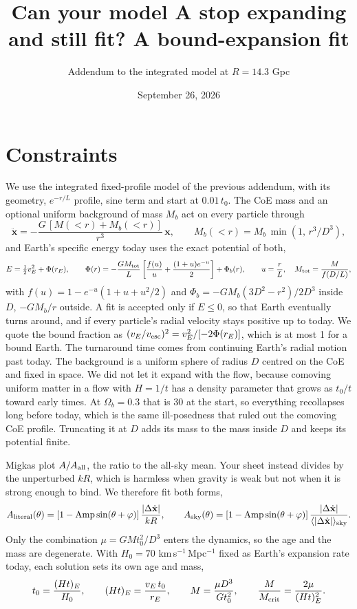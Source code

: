 \documentclass[10pt,letterpaper]{article}
\title{\vspace{-1.2cm}Can your model A stop expanding and still fit? A bound-expansion fit}
\author{Addendum to the integrated model at $R=14.3$ Gpc}
\date{September 26, 2026}
\begin{document}
\maketitle\vspace{-0.9cm}

\section{Constraints}
We use the integrated fixed-profile model of the previous addendum, with its geometry, $e^{-r/L}$ profile, sine term and start at $0.01\,t_0$. The CoE mass and an optional uniform background of mass $M_b$ act on every particle through
\begin{equation}\label{eq:eom}
\ddot{\mathbf x}=-\frac{G\,[M(<r)+M_b(<r)]}{r^3}\,\mathbf x,\qquad M_b(<r)=M_b\,\min\!\left(1,\,r^3/D^3\right),
\end{equation}
and Earth's specific energy today uses the exact potential of both,
\begin{equation}\label{eq:E}
E=\tfrac12 v_E^2+\Phi(r_E),\qquad
\Phi(r)=-\frac{G M_{\rm tot}}{L}\left[\frac{f(u)}{u}+\frac{(1+u)e^{-u}}{2}\right]+\Phi_b(r),\qquad u=\frac rL,\quad M_{\rm tot}=\frac{M}{f(D/L)},
\end{equation}
with $f(u)=1-e^{-u}(1+u+u^2/2)$ and $\Phi_b=-GM_b(3D^2-r^2)/2D^3$ inside $D$, $-GM_b/r$ outside. A fit is accepted only if $E\le0$, so that Earth eventually turns around, and if every particle's radial velocity stays positive up to today. We quote the bound fraction as $(v_E/v_{\rm esc})^2=v_E^2/[-2\Phi(r_E)]$, which is at most 1 for a bound Earth. The turnaround time comes from continuing Earth's radial motion past today. The background is a uniform sphere of radius $D$ centred on the CoE and fixed in space. We did not let it expand with the flow, because comoving uniform matter in a flow with $H=1/t$ has a density parameter that grows as $t_0/t$ toward early times. At $\Omega_b=0.3$ that is 30 at the start, so everything recollapses long before today, which is the same ill-posedness that ruled out the comoving CoE profile. Truncating it at $D$ adds its mass to the mass inside $D$ and keeps its potential finite.

Migkas plot $A/A_{\rm all}$, the ratio to the all-sky mean. Your sheet instead divides by the unperturbed $kR$, which is harmless when gravity is weak but not when it is strong enough to bind. We therefore fit both forms,
\begin{equation}\label{eq:norm}
A_{\rm literal}(\theta)=\left[1-{\rm Amp}\sin(\theta+\varphi)\right]\frac{|\Delta\dot{\mathbf x}|}{kR},\qquad
A_{\rm sky}(\theta)=\left[1-{\rm Amp}\sin(\theta+\varphi)\right]\frac{|\Delta\dot{\mathbf x}|}{\langle|\Delta\dot{\mathbf x}|\rangle_{\rm sky}} .
\end{equation}
Only the combination $\mu=GMt_0^2/D^3$ enters the dynamics, so the age and the mass are degenerate. With $H_0=70$ km\,s$^{-1}$\,Mpc$^{-1}$ fixed as Earth's expansion rate today, each solution sets its own age and mass,
\begin{equation}\label{eq:age}
t_0=\frac{(Ht)_E}{H_0},\qquad (Ht)_E=\frac{v_E\,t_0}{r_E},\qquad M=\frac{\mu D^3}{G t_0^2},\qquad \frac{M}{M_{\rm crit}}=\frac{2\mu}{(Ht)_E^2}.
\end{equation}
\end{document}
